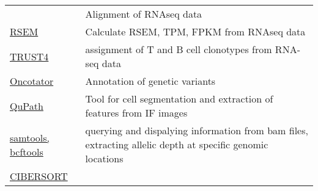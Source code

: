 \documentclass[
]{book}
\begin{document}
\begin{longtable}[]{@{}ll@{}}
\begin{minipage}[t]{0.10\columnwidth}
\end{minipage} & \begin{minipage}[t]{0.85\columnwidth}\raggedright
Alignment of RNAseq data\strut
\end{minipage}\tabularnewline
\begin{minipage}[t]{0.10\columnwidth}\raggedright
\href{https://github.com/deweylab/RSEM}{RSEM}\strut
\end{minipage} & \begin{minipage}[t]{0.85\columnwidth}\raggedright
Calculate RSEM, TPM, FPKM from RNAseq data\strut
\end{minipage}\tabularnewline
\begin{minipage}[t]{0.10\columnwidth}\raggedright
\href{https://github.com/liulab-dfci/TRUST4}{TRUST4}\strut
\end{minipage} & \begin{minipage}[t]{0.85\columnwidth}\raggedright
assignment of T and B cell clonotypes from RNA-seq data\strut
\end{minipage}\tabularnewline
\begin{minipage}[t]{0.10\columnwidth}\raggedright
\href{https://gatkforums.broadinstitute.org/gatk/discussion/4154/howto-install-and-run-oncotator-for-the-first-time}{Oncotator}\strut
\end{minipage} & \begin{minipage}[t]{0.85\columnwidth}\raggedright
Annotation of genetic variants\strut
\end{minipage}\tabularnewline
\begin{minipage}[t]{0.10\columnwidth}\raggedright
\href{https://qupath.github.io/}{QuPath}\strut
\end{minipage} & \begin{minipage}[t]{0.85\columnwidth}\raggedright
Tool for cell segmentation and extraction of features from IF images\strut
\end{minipage}\tabularnewline
\begin{minipage}[t]{0.10\columnwidth}\raggedright
\href{http://www.htslib.org/}{samtools, bcftools}\strut
\end{minipage} & \begin{minipage}[t]{0.85\columnwidth}\raggedright
querying and dispalying information from bam files, extracting allelic depth at specific genomic locations\strut
\end{minipage}\tabularnewline
\begin{minipage}[t]{0.10\columnwidth}\raggedright
\href{https://cibersort.stanford.edu/}{CIBERSORT}\strut

\end{minipage}
\end{longtable}
\end{document}
